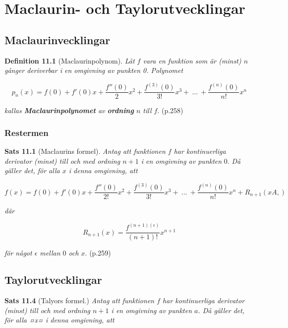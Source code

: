 \documentclass[11pt]{article}
\begin{document}
\newpage
\section{Maclaurin- och Taylorutvecklingar}

\subsection{Maclaurinvecklingar}

\textbf{Definition 11.1} (Maclaurinpolynom). \textit{Låt $f$ vara en funktion som är (minst) $n$ gånger deriverbar i en omgivning av punkten 0. Polynomet}

\begin{equation}
    p_n(x) = f(0) + f'(0)x + \frac{f''(0)}{2}x^2 + \frac{f^{(3)}(0)}{3!}x^3 +\ ...\ + \frac{f^{(n)}(0)}{n!}x^n
    \label{eq:maclaurinpolynom}
\end{equation}

\textit{kallas \textbf{Maclaurinpolynomet} av \textbf{ordning} $n$ till $f$}. (p.258)

\subsubsection{Restermen}

\textbf{Sats 11.1} (Maclaurins formel). \textit{Antag att funktionen $f$ har kontinuerliga derivator (minst) till och med ordning $n + 1$ i en omgivning av punkten} 0. \textit{Då gäller det, för alla $x$ i denna omgivning, att}

\begin{equation}
    f(x) = f(0) + f'(0)x + \frac{f''(0)}{2!}x^2 + \frac{f^{(3)}(0)}{3!}x^3 +\ ...\ + \frac{f^{(n)}(0)}{n!}x^n + R_{n + 1}(xA,)
    \label{eq:maclaurinpolynom_och_rest}
\end{equation}

\textit{där}


\begin{equation}
    R_{n + 1}(x) = \frac{f^{(n + 1)(\epsilon)}}{(n +  1)!}x^{n + 1}
    \label{eq:maclaurinpolynom_rest}
\end{equation}

\textit{för något $\epsilon$ mellan $0$ och $x$}. (p.259)

\subsection{Taylorutvecklingar}

\textbf{Sats 11.4} (Talyors formel.) \textit{Antag att funktionen $f$ har kontinuerliga derivator (minst) till och med ordning $n + 1$ i en omgivning av punkten $a$. Då gäller det, för alla ¤x¤ i denna omgivning, att}
\end{document}
